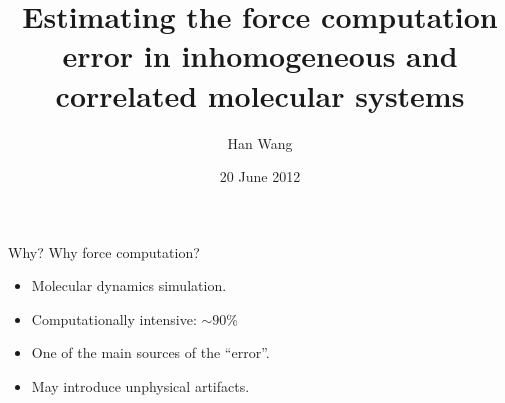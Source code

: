 \documentclass{beamer}
\newcommand{\redc}[1]{{\color{red} #1}}
\begin{document}
\title[]{
  Estimating the force computation error in inhomogeneous and correlated
  molecular systems
}
%
\author{Han Wang}
\date[20 June 2012]{20 June 2012}
\frame{\titlepage}


\begin{frame}{Why?}
  Why force computation?
  \begin{itemize}\itemsep 3pt
  \item <2->Molecular dynamics simulation.
  \item <3->Computationally intensive: \redc{$ \sim 90 \%$}
  \item <4->One of the main sources of the \redc{``error''}.
  \item <5->May introduce \redc{unphysical artifacts}.
  \end{itemize}
  \vfill
\end{frame}
\end{document}
